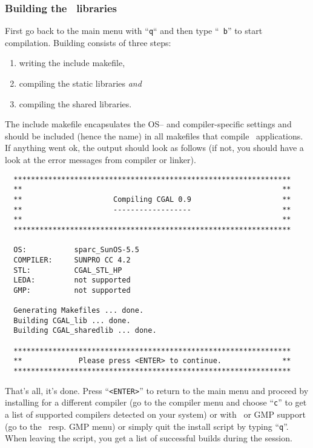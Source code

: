 \subsubsection{Building the \cgal\ libraries}

First go back to the main menu with ``{\tt q}`` and then type ``{\tt
  b}'' to start compilation. Building consists of three steps:
\begin{enumerate}
\item writing the include makefile,
\item compiling the static libraries {\it and}
\item compiling the shared libraries.
\end{enumerate}
The include makefile encapsulates the OS-- and compiler-specific
settings and should be included (hence the name) in all makefiles that
compile \cgal\ applications. If anything went ok, the output should
look as follows (if not, you should have a look at the error messages
from compiler or linker).

\begin{scriptsize}
\begin{verbatim}
  ****************************************************************
  **                                                            **
  **                     Compiling CGAL 0.9                     **
  **                     ------------------                     **
  **                                                            **
  ****************************************************************

  OS:           sparc_SunOS-5.5
  COMPILER:     SUNPRO CC 4.2
  STL:          CGAL_STL_HP
  LEDA:         not supported
  GMP:          not supported

  Generating Makefiles ... done.
  Building CGAL_lib ... done.
  Building CGAL_sharedlib ... done.

  ****************************************************************
  **             Please press <ENTER> to continue.              **
  ****************************************************************
\end{verbatim}
\end{scriptsize}

That's all, it's done. Press ``{\tt <ENTER>}'' to return to the main
menu and proceed by installing for a different compiler (go to the
compiler menu and choose ``{\tt c}'' to get a list of supported
compilers detected on your system) or with \leda\ or GMP support (go
to the \leda\ resp.  GMP menu) or simply quit the install script by
typing ``{\tt q}''. When leaving the script, you get a list of
successful builds during the session.

